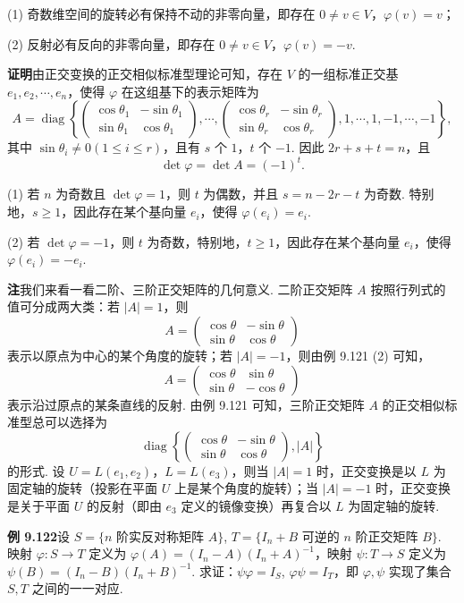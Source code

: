 \documentclass[UTF8,12pt,a4paper,fontset=fandol]{ctexart}
\begin{document}
(1) 奇数维空间的旋转必有保持不动的非零向量，即存在 $0\ne v\in V$，$\varphi(v)=v$；

(2) 反射必有反向的非零向量，即存在 $0\ne v\in V$，$\varphi(v)=-v$.

\noindent\textbf{证明}\quad 由正交变换的正交相似标准型理论可知，存在 $V$ 的一组标准正交基 $e_1,e_2,\cdots,e_n$，使得 $\varphi$ 在这组基下的表示矩阵为
\[
A=\operatorname{diag}\left\{
\begin{pmatrix}
\cos\theta_1&-\sin\theta_1\\
\sin\theta_1&\cos\theta_1
\end{pmatrix},\cdots,
\begin{pmatrix}
\cos\theta_r&-\sin\theta_r\\
\sin\theta_r&\cos\theta_r
\end{pmatrix},
1,\cdots,1,-1,\cdots,-1
\right\},
\]
其中 $\sin\theta_i\ne0(1\le i\le r)$，且有 $s$ 个 $1$，$t$ 个 $-1$. 因此 $2r+s+t=n$，且
\[
\det\varphi=\det A=(-1)^t.
\]

(1) 若 $n$ 为奇数且 $\det\varphi=1$，则 $t$ 为偶数，并且 $s=n-2r-t$ 为奇数. 特别地，$s\ge1$，因此存在某个基向量 $e_i$，使得 $\varphi(e_i)=e_i$.

(2) 若 $\det\varphi=-1$，则 $t$ 为奇数，特别地，$t\ge1$，因此存在某个基向量 $e_i$，使得 $\varphi(e_i)=-e_i$.

\noindent\textbf{注}\quad 我们来看一看二阶、三阶正交矩阵的几何意义. 二阶正交矩阵 $A$ 按照行列式的值可分成两大类：若 $|A|=1$，则
\[
A=\begin{pmatrix}
\cos\theta&-\sin\theta\\
\sin\theta&\cos\theta
\end{pmatrix}
\]
表示以原点为中心的某个角度的旋转；若 $|A|=-1$，则由例 9.121 (2) 可知，
\[
A=\begin{pmatrix}
\cos\theta&\sin\theta\\
\sin\theta&-\cos\theta
\end{pmatrix}
\]
表示沿过原点的某条直线的反射. 由例 9.121 可知，三阶正交矩阵 $A$ 的正交相似标准型总可以选择为
\[
\operatorname{diag}\left\{
\begin{pmatrix}
\cos\theta&-\sin\theta\\
\sin\theta&\cos\theta
\end{pmatrix},
|A|
\right\}
\]
的形式. 设 $U=L(e_1,e_2)$，$L=L(e_3)$，则当 $|A|=1$ 时，正交变换是以 $L$ 为固定轴的旋转（投影在平面 $U$ 上是某个角度的旋转）；当 $|A|=-1$ 时，正交变换是关于平面 $U$ 的反射（即由 $e_3$ 定义的镜像变换）再复合以 $L$ 为固定轴的旋转.

\noindent\textbf{例 9.122}\quad 设 $S=\{n\text{ 阶实反对称矩阵 }A\}$, $T=\{I_n+B\text{ 可逆的 }n\text{ 阶正交矩阵 }B\}$. 映射 $\varphi:S\to T$ 定义为 $\varphi(A)=(I_n-A)(I_n+A)^{-1}$，映射 $\psi:T\to S$ 定义为 $\psi(B)=(I_n-B)(I_n+B)^{-1}$. 求证：$\psi\varphi=I_S$, $\varphi\psi=I_T$，即 $\varphi,\psi$ 实现了集合 $S,T$ 之间的一一对应.
\end{document}
